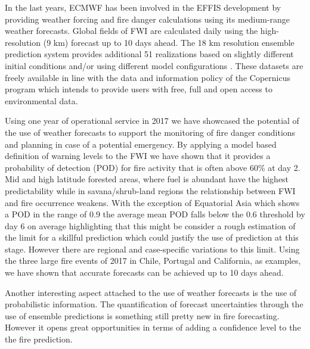 \documentclass[, manuscript]{copernicus}
\begin{document}
\conclusions

In the last years, ECMWF has been involved in the EFFIS development by
providing weather forcing and fire danger calculations using its
medium-range weather forecasts. Global fields of FWI are calculated
daily using the high-resolution (9 km) forecast up to 10 days ahead. The
18 km resolution ensemble prediction system provides additional 51
realizations based on slightly different initial conditions and/or using
different model configurations \citep{molteni:96}. These datasets are
freely available in line with the data and information policy of the
Copernicus program which intends to provide users with free, full and
open access to environmental data.

Using one year of operational service in 2017 we have showcased the
potential of the use of weather forecasts to support the monitoring of
fire danger conditions and planning in case of a potential emergency. By
applying a model based definition of warning levels to the FWI we have
shown that it provides a probability of detection (POD) for fire
activity that is often above 60\% at day 2. Mid and high latitude
forested areas, where fuel is abundant have the highest predictability
while in savana/shrub-land regions the relationship between FWI and fire
occurrence weakens. With the exception of Equatorial Asia which shows a
POD in the range of 0.9 the average mean POD falls below the 0.6
threshold by day 6 on average highlighting that this might be consider a
rough estimation of the limit for a skillful prediction which could
justify the use of prediction at this stage. However there are regional
and case-specific variations to this limit. Using the three large fire
events of 2017 in Chile, Portugal and California, as examples, we have
shown that accurate forecasts can be achieved up to 10 days ahead.

Another interesting aspect attached to the use of weather forecasts is
the use of probabilistic information. The quantification of forecast
uncertainties through the use of ensemble predictions is something still
pretty new in fire forecasting. However it opens great opportunities in
terms of adding a confidence level to the the fire prediction.


\end{document}
